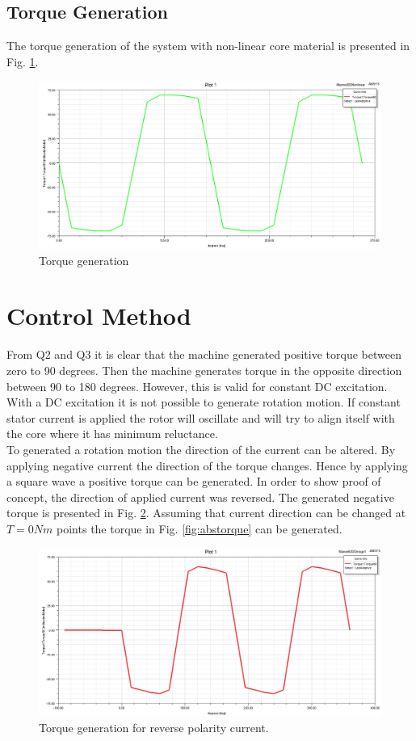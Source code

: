 \documentclass{article}
\begin{document}
\subsection{Torque Generation}
The torque generation of the system with non-linear core material is presented in Fig. \ref{fig:torquenonlinear}.
\begin{figure}[H]
	\centering
	\includegraphics[width=1\linewidth]{Figurler/Q3/torque}
	\caption{Torque generation}
	\label{fig:torquenonlinear}
\end{figure}

\section{Control Method}
From Q2 and Q3 it is clear that the machine generated positive torque between zero to 90 degrees. Then the machine generates torque in the opposite direction between 90 to 180 degrees. However, this is valid for constant DC excitation. With a DC excitation it is not possible to generate rotation motion. If constant stator current is applied the rotor will oscillate and will try to align itself with the core where it has minimum reluctance.\\
To generated a rotation motion the direction of the current can be altered. By applying negative current the direction of the torque changes. Hence by applying a square wave a positive torque can be generated. In order to show proof of concept, the direction of applied current was reversed. The generated negative torque is presented in Fig. \ref{fig:negativetorque}. Assuming that current direction can be changed at $T=0Nm$ points the torque in Fig. \ref{fig:abstorque} can be generated.

\begin{figure}[H]
	\centering
	\includegraphics[width=1\linewidth]{Figurler/Q4/negative_torque}
	\caption{Torque generation for reverse polarity current.}
	\label{fig:negativetorque}
\end{figure}
\end{document}
